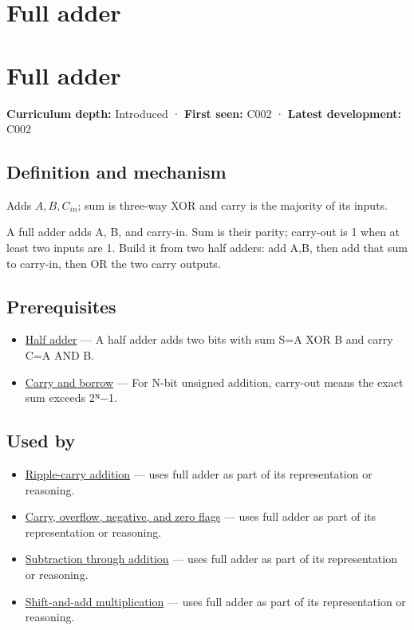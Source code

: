 \hypertarget{appendix-d1a5b1e520c2}{}
\section*{Full adder}
\section{Full adder}\label{appendix-d1a5b1e520c2-full-adder}

\textbf{Curriculum depth:} Introduced · \textbf{First seen:} C002 · \textbf{Latest development:} C002

\subsection{Definition and mechanism}\label{appendix-d1a5b1e520c2-definition-and-mechanism}

Adds \(A,B,C_{in}\); sum is three-way XOR and carry is the majority of its inputs.

A full adder adds A, B, and carry-in. Sum is their parity; carry-out is 1 when at least two inputs are 1. Build it from two half adders: add A,B, then add that sum to carry-in, then OR the two carry outputs.

\subsection{Prerequisites}\label{appendix-d1a5b1e520c2-prerequisites}

\begin{itemize}
\tightlist
\item
  \hyperref[appendix-1652d27a8e90]{Half adder} --- A half adder adds two bits with sum S=A XOR B and carry C=A AND B.
\item
  \hyperref[appendix-d52d5f78ffd1]{Carry and borrow} --- For N-bit unsigned addition, carry-out means the exact sum exceeds 2ᴺ−1.
\end{itemize}

\subsection{Used by}\label{appendix-d1a5b1e520c2-used-by}

\begin{itemize}
\tightlist
\item
  \hyperref[appendix-17917d9fdbe3]{Ripple-carry addition} --- uses full adder as part of its representation or reasoning.
\item
  \hyperref[appendix-8d687c9c08ab]{Carry, overflow, negative, and zero flags} --- uses full adder as part of its representation or reasoning.
\item
  \hyperref[appendix-1c7df340573e]{Subtraction through addition} --- uses full adder as part of its representation or reasoning.
\item
  \hyperref[appendix-a65290d66ed9]{Shift-and-add multiplication} --- uses full adder as part of its representation or reasoning.
\end{itemize}

